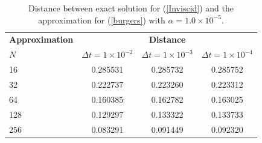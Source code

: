 	\begin{table}[H]
		\centering
		\begin{tabular}{lccc}
			\toprule
			\multicolumn{1}{c}{\textbf{Approximation}} & \multicolumn{3}{c}{\textbf{Distance}} \\
			\hspace{12mm} $N$ & $\Delta t=1\times 10^{-2}$ & $\Delta t=1\times 10^{-3}$ & $\Delta t=1\times 10^{-4}$ \\
			\midrule
			\hspace{12mm} 16 & 0.285531 & 0.285732 & 0.285752 \\
			\midrule
			\hspace{12mm} 32 & 0.222737 & 0.223260 & 0.223312 \\
			\midrule
			\hspace{12mm} 64 & 0.160385 & 0.162782 & 0.163025 \\
			\midrule
			\hspace{12mm} 128 & 0.129297 & 0.133322 & 0.133733 \\
			\midrule
			\hspace{12mm} 256 & 0.083291 & 0.091449 & 0.092320 \\
			\bottomrule
		\end{tabular}
		\caption{Distance between exact solution for (\ref{Inviscid}) and the approximation for (\ref{burgers}) with $\alpha = 1.0 \times 10^{-5}$.}
	\end{table}